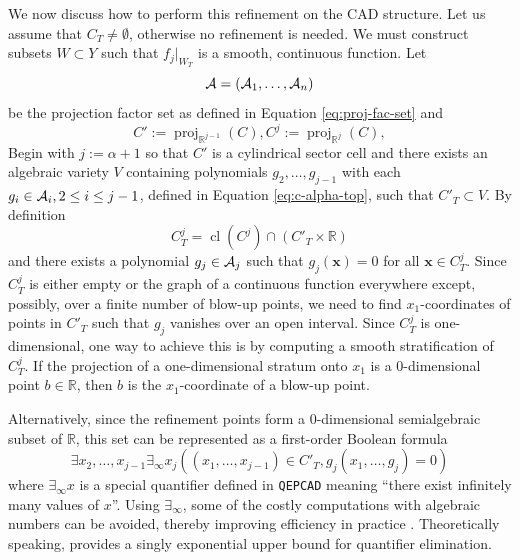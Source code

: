\documentclass[
]{book}
\theoremstyle{definition}
\theoremstyle{definition}
\theoremstyle{definition}
\theoremstyle{definition}
\theoremstyle{remark}
\begin{document}
We now discuss how to perform this refinement on the CAD structure. Let us assume that \(C_T\ne \emptyset\), otherwise no refinement is needed. We must construct subsets \(W \subset Y\) such that \(f_j\vert_{W_T}\) is a smooth, continuous function.
Let
\[
{\cal A} = ({\cal A}_1, \ldots, {\cal A}_n)
\]
be the projection factor set as defined in Equation \eqref{eq:proj-fac-set} and
\[
C' := {\operatorname{proj}_{\mathbb{R}^{j-1}}}(C), C^j := {\operatorname{proj}_{\mathbb{R}^{j}}}(C),
\]
Begin with \(j := \alpha+1\) so that \(C'\) is a cylindrical sector cell and there exists an algebraic variety \(V\) containing polynomials \(g_2,\ldots,g_{j-1}\) with each \(g_i \in {\cal A}_i, 2 \le i \le j-1\), defined in Equation \eqref{eq:c-alpha-top}, such that \(C'_T\subset V\).
By definition \[
C^j_T = {\operatorname{cl} \left( C^j \right)} \cap (C'_T \times \mathbb{R})
\] and there exists a polynomial \(g_j \in {\cal A}_j\) such that \(g_j(\mathbf{x}) = 0\) for all \(\mathbf{x} \in C^j_T\). Since \(C^j_T\) is either empty or the graph of a continuous function everywhere except, possibly, over a finite number of blow-up points, we need to find \(x_1\)-coordinates of points in \(C'_T\) such that \(g_j\) vanishes over an open interval.
Since \(C^j_T\) is one-dimensional, one way to achieve this is by computing a smooth stratification of \(C^j_T\). If the projection of a one-dimensional stratum onto \(x_1\) is a \(0\)-dimensional point \(b \in \mathbb{R}\), then \(b\) is the \(x_1\)-coordinate of a blow-up point.

Alternatively, since the refinement points form a \(0\)-dimensional semialgebraic subset of \(\mathbb{R}\), this set can be represented as a first-order Boolean formula
\[
\exists x_2,\ldots,x_{j-1} \exists_\infty x_j ((x_1,\ldots,x_{j-1}) \in C'_T, g_j(x_1,\ldots,g_j) = 0)
\]
where \(\exists_\infty x\) is a special quantifier defined in \texttt{QEPCAD} meaning ``there exist infinitely many values of \(x\)''.
Using \(\exists_\infty\), some of the costly computations with algebraic numbers can be avoided, thereby improving efficiency in practice \citep{qepcadDocs}.
Theoretically speaking, \citep[Algorithm 14.21]{bpr2006} provides a singly exponential upper bound for quantifier elimination.
\end{document}
